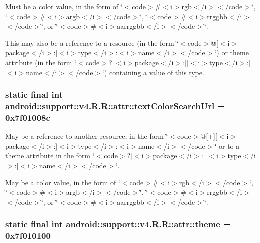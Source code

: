 Must be a \hyperlink{classandroid_1_1support_1_1v4_1_1_r_1_1color}{color} value, in the form of \char`\"{}$<$code$>$\#$<$i$>$rgb$<$/i$>$$<$/code$>$\char`\"{}, \char`\"{}$<$code$>$\#$<$i$>$argb$<$/i$>$$<$/code$>$\char`\"{}, \char`\"{}$<$code$>$\#$<$i$>$rrggbb$<$/i$>$$<$/code$>$\char`\"{}, or \char`\"{}$<$code$>$\#$<$i$>$aarrggbb$<$/i$>$$<$/code$>$\char`\"{}. 

This may also be a reference to a resource (in the form \char`\"{}$<$code$>$@\mbox{[}$<$i$>$package$<$/i$>$:\mbox{]}$<$i$>$type$<$/i$>$:$<$i$>$name$<$/i$>$$<$/code$>$\char`\"{}) or theme attribute (in the form \char`\"{}$<$code$>$?\mbox{[}$<$i$>$package$<$/i$>$:\mbox{]}\mbox{[}$<$i$>$type$<$/i$>$:\mbox{]}$<$i$>$name$<$/i$>$$<$/code$>$\char`\"{}) containing a value of this type. \hypertarget{classandroid_1_1support_1_1v4_1_1_r_1_1attr_ad6df055025971bb7ffce78163d0b7ae}{
\subsubsection[{textColorSearchUrl}]{\setlength{\rightskip}{0pt plus 5cm}static final int android::support::v4.R.R::attr::textColorSearchUrl = 0x7f01008c}}
\label{classandroid_1_1support_1_1v4_1_1_r_1_1attr_ad6df055025971bb7ffce78163d0b7ae}


May be a reference to another resource, in the form \char`\"{}$<$code$>$@\mbox{[}+\mbox{]}\mbox{[}$<$i$>$package$<$/i$>$:\mbox{]}$<$i$>$type$<$/i$>$:$<$i$>$name$<$/i$>$$<$/code$>$\char`\"{} or to a theme attribute in the form \char`\"{}$<$code$>$?\mbox{[}$<$i$>$package$<$/i$>$:\mbox{]}\mbox{[}$<$i$>$type$<$/i$>$:\mbox{]}$<$i$>$name$<$/i$>$$<$/code$>$\char`\"{}. 

May be a \hyperlink{classandroid_1_1support_1_1v4_1_1_r_1_1color}{color} value, in the form of \char`\"{}$<$code$>$\#$<$i$>$rgb$<$/i$>$$<$/code$>$\char`\"{}, \char`\"{}$<$code$>$\#$<$i$>$argb$<$/i$>$$<$/code$>$\char`\"{}, \char`\"{}$<$code$>$\#$<$i$>$rrggbb$<$/i$>$$<$/code$>$\char`\"{}, or \char`\"{}$<$code$>$\#$<$i$>$aarrggbb$<$/i$>$$<$/code$>$\char`\"{}. \hypertarget{classandroid_1_1support_1_1v4_1_1_r_1_1attr_9c2de200d2e984d5ff7fa88b9204a548}{
\subsubsection[{theme}]{\setlength{\rightskip}{0pt plus 5cm}static final int android::support::v4.R.R::attr::theme = 0x7f010100}}
\label{classandroid_1_1support_1_1v4_1_1_r_1_1attr_9c2de200d2e984d5ff7fa88b9204a548}


